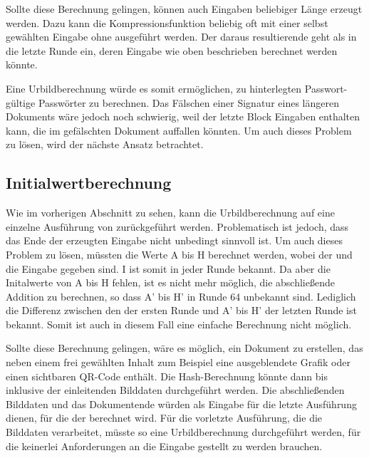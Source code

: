 Sollte diese Berechnung gelingen, können auch Eingaben beliebiger Länge erzeugt werden. Dazu kann die Kompressionsfunktion beliebig oft mit einer selbst gewählten Eingabe
ohne  ausgeführt werden. Der daraus resultierende  geht als  in die letzte Runde ein, deren Eingabe wie oben beschrieben berechnet werden könnte.

Eine Urbildberechnung würde es somit ermöglichen, zu hinterlegten Passwort- gültige Passwörter zu berechnen. Das Fälschen einer Signatur eines längeren Dokuments
wäre jedoch noch schwierig, weil der letzte Block Eingaben enthalten kann, die im gefälschten Dokument auffallen könnten. Um auch dieses Problem zu lösen, wird der nächste
Ansatz betrachtet.

\subsection{Initialwertberechnung}
\label{sec:initialwertberechnung}
Wie im vorherigen Abschnitt zu sehen, kann die Urbildberechnung auf eine einzelne Ausführung von  zurückgeführt werden.
Problematisch ist jedoch, dass das Ende der erzeugten Eingabe nicht unbedingt sinnvoll ist. Um auch dieses Problem zu lösen, müssten
die Werte A bis H berechnet werden, wobei der  und die Eingabe gegeben sind. I ist somit in jeder Runde bekannt. Da aber die Initalwerte
von A bis H fehlen, ist es nicht mehr möglich, die abschließende Addition zu berechnen, so dass A' bis H' in Runde 64 unbekannt sind. Lediglich
die Differenz zwischen den  der ersten Runde und A' bis H' der letzten Runde ist bekannt. Somit ist auch in diesem Fall eine
einfache Berechnung nicht möglich.

Sollte diese Berechnung gelingen, wäre es möglich, ein Dokument zu erstellen, das neben einem frei gewählten Inhalt zum Beispiel eine ausgeblendete
Grafik oder einen sichtbaren QR-Code enthält. Die Hash-Berechnung könnte dann bis inklusive der einleitenden Bilddaten durchgeführt werden.
Die abschließenden Bilddaten und das Dokumentende würden als Eingabe für die letzte Ausführung dienen, für die der  berechnet wird.
Für die vorletzte Ausführung, die die Bilddaten verarbeitet, müsste so eine Urbildberechnung durchgeführt werden, für die keinerlei Anforderungen an
die Eingabe gestellt zu werden brauchen.

